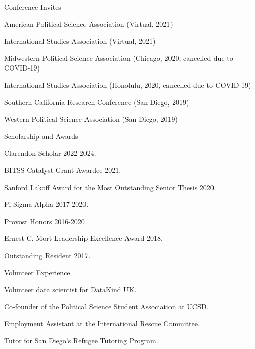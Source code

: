 \documentclass[10pt]{resume} %
\begin{document}
	\begin{rSection}{Conference Invites}
		\itemsep -5pt
		\item American Political Science Association (Virtual, 2021)
		\item International Studies Association (Virtual, 2021)
		\item Midwestern Political Science Association (Chicago, 2020, cancelled due to COVID-19)
		\item International Studies Association (Honolulu, 2020, cancelled due to COVID-19)
		\item Southern California Research Conference (San Diego, 2019)
		\item Western Political Science Association (San Diego, 2019)
	\end{rSection}
	
	
	\begin{rSection}{Scholarship and Awards}
		\itemsep -5pt
		\item Clarendon Scholar 2022-2024.
		\item BITSS Catalyst Grant Awardee 2021.
		\item Sanford Lakoff Award for the Most Outstanding Senior Thesis 2020.
		\item Pi Sigma Alpha 2017-2020. 
		\item Provost Honors 2016-2020. 
		\item Ernest C. Mort Leadership Excellence Award 2018. 
		\item Outstanding Resident 2017.
	\end{rSection}
	
	\begin{rSection}{Volunteer Experience} \itemsep -5pt
		\item Volunteer data scientist for DataKind UK.
		\item Co-founder of the Political Science Student Association at UCSD.
		\item Employment Assistant at the International Rescue Committee.
		\item Tutor for San Diego's Refugee Tutoring Program.
	\end{rSection}
\end{document}
